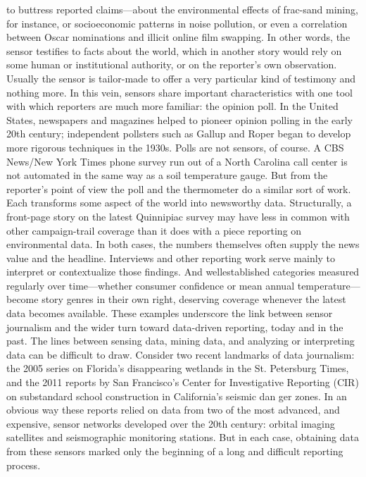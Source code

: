 to buttress reported claims—about the environmental effects of frac-sand
mining, for instance, or socioeconomic patterns in noise pollution, or even
a correlation between Oscar nominations and illicit online film swapping.
In other words, the sensor testifies to facts about the world, which in
another story would rely on some human or institutional authority, or on
the reporter's own observation. Usually the sensor is tailor-made to offer
a very particular kind of testimony and nothing more. In this vein, sensors
share important characteristics with one tool with which reporters are
much more familiar: the opinion poll. In the United States, newspapers and
magazines helped to pioneer opinion polling in the early 20th century; independent
pollsters such as Gallup and Roper began to develop more rigorous
techniques in the 1930s. Polls are not sensors, of course. A CBS News/New
York Times phone survey run out of a North Carolina call center is not automated
in the same way as a soil temperature gauge. But from the reporter's
point of view the poll and the thermometer do a similar sort of work. Each
transforms some aspect of the world into newsworthy data.
Structurally, a front-page story on the latest Quinnipiac survey may have
less in common with other campaign-trail coverage than it does with a piece
reporting on environmental data. In both cases, the numbers themselves
often supply the news value and the headline. Interviews and other reporting
work serve mainly to interpret or contextualize those findings. And wellestablished
categories measured regularly over time—whether consumer
confidence or mean annual temperature—become story genres in their own
right, deserving coverage whenever the latest data becomes available.
These examples underscore the link between sensor journalism and the
wider turn toward data-driven reporting, today and in the past. The lines
between sensing data, mining data, and analyzing or interpreting data can
be difficult to draw. Consider two recent landmarks of data journalism: the
2005 series on Florida's disappearing wetlands in the St. Petersburg Times,
and the 2011 reports by San Francisco's Center for Investigative Reporting
(CIR) on substandard school construction in California's seismic dan
ger zones. In an obvious way these reports relied on data from two of the
most advanced, and expensive, sensor networks developed over the 20th
century: orbital imaging satellites and seismographic monitoring stations.
But in each case, obtaining data from these sensors marked only the beginning
of a long and difficult reporting process.
